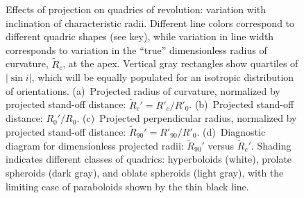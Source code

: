 \begin{figure}
  \caption[]{Effects of projection on quadrics of revolution:
    variation with inclination of characteristic radii.  Different
    line colors correspond to different quadric shapes (see key),
    while variation in line width corresponds to variation in the
    ``true'' dimensionless radius of curvature, \(\tilde{R}_c\), at
    the apex. Vertical gray rectangles show quartiles of \(|\sin i|\),
    which will be equally populated for an isotropic distribution of
    orientations. (a)~Projected radius of curvature, normalized by
    projected stand-off distance: \( \tilde{R}_c' = R'_c /
    R'_0\). (b)~Projected stand-off distance: \(R_0' / R_0\).
    (c)~Projected perpendicular radius, normalized by projected
    stand-off distance: \( \tilde{R}_{90}' = R'_{90} /
    R'_0\). (d)~Diagnostic diagram for dimensionless projected radii:
    \(\tilde{R}_{90}'\) versus \(\tilde{R}_c'\).  Shading indicates
    different classes of quadrics: hyperboloids (white), prolate
    spheroids (dark gray), and oblate spheroids (light gray), with the
    limiting case of paraboloids shown by the thin black line.}
  \label{fig:quadric-projection}
\end{figure}

